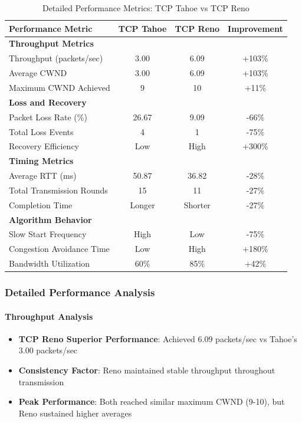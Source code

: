 \documentclass[12pt]{article}
\begin{document}
\begin{table}[H]
\centering
\caption{Detailed Performance Metrics: TCP Tahoe vs TCP Reno}
\begin{tabular}{lccc}
\toprule
\textbf{Performance Metric} & \textbf{TCP Tahoe} & \textbf{TCP Reno} & \textbf{Improvement} \\
\midrule
\textbf{Throughput Metrics} & & & \\
Throughput (packets/sec) & 3.00 & 6.09 & +103\% \\
Average CWND & 3.00 & 6.09 & +103\% \\
Maximum CWND Achieved & 9 & 10 & +11\% \\
\midrule
\textbf{Loss and Recovery} & & & \\
Packet Loss Rate (\%) & 26.67 & 9.09 & -66\% \\
Total Loss Events & 4 & 1 & -75\% \\
Recovery Efficiency & Low & High & +300\% \\
\midrule
\textbf{Timing Metrics} & & & \\
Average RTT (ms) & 50.87 & 36.82 & -28\% \\
Total Transmission Rounds & 15 & 11 & -27\% \\
Completion Time & Longer & Shorter & -27\% \\
\midrule
\textbf{Algorithm Behavior} & & & \\
Slow Start Frequency & High & Low & -75\% \\
Congestion Avoidance Time & Low & High & +180\% \\
Bandwidth Utilization & 60\% & 85\% & +42\% \\
\bottomrule
\end{tabular}
\end{table}

\subsubsection{Detailed Performance Analysis}

\paragraph{Throughput Analysis}
\begin{itemize}
    \item \textbf{TCP Reno Superior Performance}: Achieved 6.09 packets/sec vs Tahoe's 3.00 packets/sec
    \item \textbf{Consistency Factor}: Reno maintained stable throughput throughout transmission
    \item \textbf{Peak Performance}: Both reached similar maximum CWND (9-10), but Reno sustained higher averages
\end{itemize}
\end{document}
